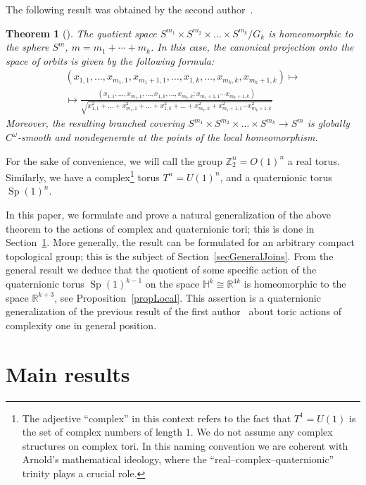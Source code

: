 \documentclass[english, 12pt]{amsproc}
\newcounter{thcounter}
\numberwithin{equation}{section}
\theoremstyle{plain}
\newtheorem{thm}[thcounter]{Theorem}
\theoremstyle{definition}
\theoremstyle{remark}
\DeclareMathOperator{\Sp}{Sp}
\newcommand{\Zo}{\mathbb{Z}}
\newcommand{\Ro}{\mathbb{R}}
\newcommand{\Ho}{\mathbb{H}}
\newcommand{\Zt}{\Zo_2}
\begin{document}
The following result was obtained by the second author~\cite{Gug19}.

\begin{thm}[\cite{Gug19}]\label{thmReal}
The quotient space $S^{m_1}\times S^{m_2}\times \ldots \times S^{m_k}/G_k$ is homeomorphic to the sphere $S^m$, $m = m_1+\cdots + m_k$. In this case, the canonical projection onto the space of orbits is given by the following formula:
\begin{multline}
(x_{1,1}, \ldots, x_{m_1,1}, x_{m_{1} +1,1}, \ldots, x_{1,k}, \ldots, x_{m_k,k}, x_{m_k +1,k}) \mapsto\\ \mapsto
\frac{(x_{1,1}, \ldots, x_{m_1,1}, \ldots, x_{1,k}, \ldots, x_{m_k,k} ; x_{m_{1} +1,1} \cdots x_{m_k +1,k})}{\sqrt{ x_{1,1}^2 +  \ldots + x_{m_1,1}^2 + \ldots + x_{1,k}^2 + \ldots + x_{m_k,k}^2 + x_{m_{1} +1,1}^2 \cdots x_{m_k +1,k}^2 }}
\end{multline}
Moreover, the resulting branched covering $S^{m_1}\times S^{m_2}\times \ldots \times S^{m_k} \to S^m$ is globally $C^{\omega}$-smooth and nondegenerate at the points of the local homeomorphism.
\end{thm}

For the sake of convenience, we will call the group $\Zt^n=O(1)^n$ a real torus. Similarly, we have a complex\footnote{The adjective ``complex'' in this context refers to the fact that $T^1=U(1)$ is the set of complex numbers of length $1$. We do not assume any complex structures on complex tori. In this naming convention we are coherent with Arnold's mathematical ideology, where the ``real--complex--quaternionic'' trinity plays a crucial role.} torus $T^n=U(1)^n$, and a quaternionic torus $\Sp(1)^n$.

In this paper, we formulate and prove a natural generalization of the above theorem to the actions of complex and quaternionic tori; this is done in Section~\ref{secMainResults}. More generally, the result can be formulated for an arbitrary compact topological group; this is the subject of Section~\ref{secGeneralJoins}. From the general result we deduce that the quotient of some specific action of the quaternionic torus $\Sp(1)^{k-1}$ on the space $\Ho^k\cong \Ro^{4k}$ is homeomorphic to the space $\Ro^{k+3}$, see Proposition~\ref{propLocal}. This assertion is a quaternionic generalization of the previous result of the first author~\cite{AyzCompl} about toric actions of complexity one in general position.


\section{Main results}\label{secMainResults}
\end{document}
